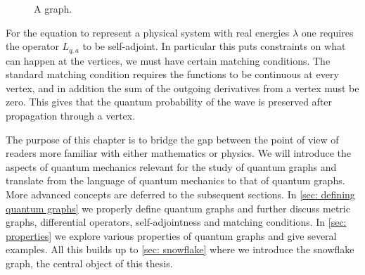\begin{figure}[h]
 \centering
  \caption{A graph.}
  \label{fig: basic quantum graph}
\end{figure}


For the equation to represent a physical system with real energies $\lambda$ one requires the operator $L_{q,a}$ to be self-adjoint. In particular this puts constraints on what can happen at the vertices, we must have certain matching conditions. The standard matching condition requires the functions to be continuous at every vertex, and in addition the sum of the outgoing derivatives from a vertex must be zero. This gives that the quantum probability of the wave is preserved after propagation through a vertex.

The purpose of this chapter is to bridge the gap between the point of view of readers more familiar with either mathematics or physics. We will introduce the aspects of quantum mechanics relevant for the study of quantum graphs and translate from the language of quantum mechanics to that of quantum graphs. More advanced concepts are deferred to the subsequent sections. In \cref{sec: defining quantum graphs} we properly define quantum graphs and further discuss metric graphs, differential operators, self-adjointness and matching conditions. In \cref{sec: properties} we explore various properties of quantum graphs and give several examples. All this builds up to \cref{sec: snowflake} where we introduce the snowflake graph, the central object of this thesis.

